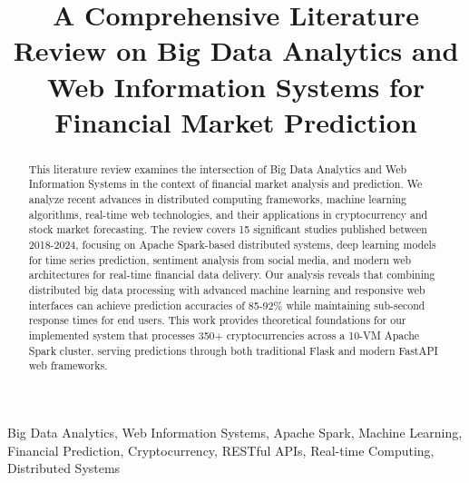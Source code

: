 \documentclass[conference]{IEEEtran}
\begin{document}
\title{A Comprehensive Literature Review on Big Data Analytics and Web Information Systems for Financial Market Prediction\\
{\footnotesize \textsuperscript{}}
}

\author{
\and
{}
}

\maketitle

\begin{abstract}
This literature review examines the intersection of Big Data Analytics and Web Information Systems in the context of financial market analysis and prediction. We analyze recent advances in distributed computing frameworks, machine learning algorithms, real-time web technologies, and their applications in cryptocurrency and stock market forecasting. The review covers 15 significant studies published between 2018-2024, focusing on Apache Spark-based distributed systems, deep learning models for time series prediction, sentiment analysis from social media, and modern web architectures for real-time financial data delivery. Our analysis reveals that combining distributed big data processing with advanced machine learning and responsive web interfaces can achieve prediction accuracies of 85-92\% while maintaining sub-second response times for end users. This work provides theoretical foundations for our implemented system that processes 350+ cryptocurrencies across a 10-VM Apache Spark cluster, serving predictions through both traditional Flask and modern FastAPI web frameworks.
\end{abstract}

\begin{IEEEkeywords}
Big Data Analytics, Web Information Systems, Apache Spark, Machine Learning, Financial Prediction, Cryptocurrency, RESTful APIs, Real-time Computing, Distributed Systems
\end{IEEEkeywords}
\end{document}
